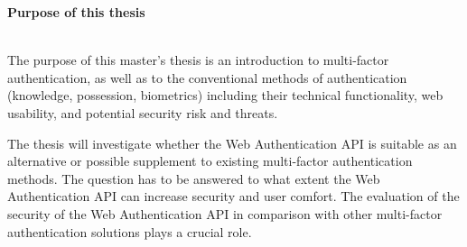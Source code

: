 \thispagestyle{empty}

{}

\begin{large}
	\textbf{Purpose of this thesis} \\ \\
\end{large}

The purpose of this master's thesis is an introduction to multi-factor authentication, as well as to the conventional methods of authentication (knowledge, possession, biometrics) including their technical functionality, web usability, and potential security risk and threats.

The thesis will investigate whether the Web Authentication API is suitable as an alternative or possible supplement to existing multi-factor authentication methods. The question has to be answered to what extent the Web Authentication API can increase security and user comfort. The evaluation of the security of the Web Authentication API in comparison with other multi-factor authentication solutions plays a crucial role.

\newpage